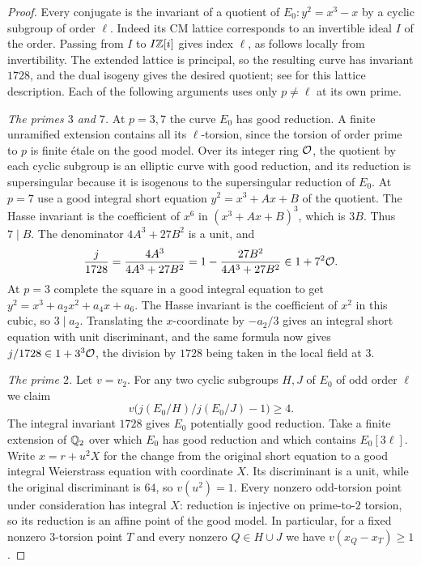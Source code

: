 \begin{proof}
Every conjugate is the invariant of a quotient of $E_0\colon y^2=x^3-x$ by a cyclic
subgroup of order $\ell$. Indeed its CM lattice corresponds to an invertible ideal $I$ of
the order. Passing from $I$ to $I\mathbb{Z}[i]$ gives index $\ell$, as follows locally from
invertibility. The extended lattice is principal, so the resulting curve has invariant
$1728$, and the dual isogeny gives the desired quotient; see \cite{Sutherland2012Isogeny}
for this lattice description. Each of the following arguments uses only $p\ne\ell$ at its
own prime.

\emph{The primes $3$ and $7$.} At $p=3,7$ the curve $E_0$ has good reduction. A finite
unramified extension contains all its $\ell$-torsion, since the torsion of order prime to
$p$ is finite \'etale on the good model. Over its integer ring $\mathcal{O}$, the quotient by each
cyclic subgroup is an elliptic curve with good reduction, and its reduction is
supersingular because it is isogenous to the supersingular reduction of $E_0$. At $p=7$
use a good integral short equation $y^2=x^3+Ax+B$ of the quotient. The Hasse invariant is
the coefficient of $x^6$ in $(x^3+Ax+B)^3$, which is $3B$. Thus $7\mid B$. The denominator
$4A^3+27B^2$ is a unit, and
\[
 \frac{j}{1728}=\frac{4A^3}{4A^3+27B^2}=1-\frac{27B^2}{4A^3+27B^2}\in1+7^2\mathcal{O} .
\]
At $p=3$ complete the square in a good integral equation to get
$y^2=x^3+a_2x^2+a_4x+a_6$. The Hasse invariant is the coefficient of $x^2$ in this cubic,
so $3\mid a_2$. Translating the $x$-coordinate by $-a_2/3$ gives an integral short equation
with unit discriminant, and the same formula now gives $j/1728\in1+3^3\mathcal{O}$, the division
by $1728$ being taken in the local field at $3$.

\emph{The prime $2$.} Let $v=v_2$. For any two cyclic subgroups $H,J$ of $E_0$ of odd
order $\ell$ we claim
\begin{equation}\label{smd:eq:G0}
 v\bigl(j(E_0/H)/j(E_0/J)-1\bigr)\ge4 .
\end{equation}
The integral invariant $1728$ gives $E_0$ potentially good reduction. Take a finite
extension of $\mathbb{Q}_2$ over which $E_0$ has good reduction and which contains
$E_0[3\ell]$. Write $x=r+u^2X$ for the change from the original short equation to a good
integral Weierstrass equation with coordinate $X$. Its discriminant is a unit, while the
original discriminant is $64$, so $v(u^2)=1$. Every nonzero odd-torsion point under
consideration has integral $X$: reduction is injective on prime-to-$2$ torsion, so its
reduction is an affine point of the good model. In particular, for a fixed nonzero
$3$-torsion point $T$ and every nonzero $Q\in H\cup J$ we have $v(x_Q-x_T)\ge1$.


\end{proof}
